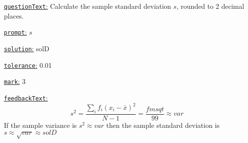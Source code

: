 \documentclass[preview]{standalone}
\newcommand \fieldname[1]{\underline{\texttt{#1}:}}
\begin{document}
\fieldname{questionText}
Calculate the sample standard deviation $s$, rounded to 2 decimal places.

\fieldname{prompt}
$s$

\fieldname{solution}
solD

\fieldname{tolerance}
0.01

\fieldname{mark}
3

\fieldname{feedbackText}
\[
s^2 = \frac{\sum_i f_i (x_i-\bar x)^2}{N-1} =\frac{{fmsqt}}{99} \approx {var}
\]
If the sample variance is $s^2 \approx {var}$ then the sample standard deviation is $s \approx \sqrt{{var}} \approx {solD}$

\end{document}
